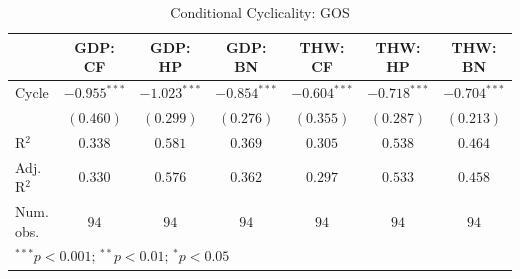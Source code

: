 
\usepackage{booktabs}

\begin{table}
\begin{center}
\begin{tabular}{l c c c c c c}
\toprule
 & GDP: CF & GDP: HP & GDP: BN & THW: CF & THW: HP & THW: BN \\
\midrule
Cycle      & $-0.955^{***}$ & $-1.023^{***}$ & $-0.854^{***}$ & $-0.604^{***}$ & $-0.718^{***}$ & $-0.704^{***}$ \\
           & $(0.460)$      & $(0.299)$      & $(0.276)$      & $(0.355)$      & $(0.287)$      & $(0.213)$      \\
\midrule
R$^2$      & $0.338$        & $0.581$        & $0.369$        & $0.305$        & $0.538$        & $0.464$        \\
Adj. R$^2$ & $0.330$        & $0.576$        & $0.362$        & $0.297$        & $0.533$        & $0.458$        \\
Num. obs.  & $94$           & $94$           & $94$           & $94$           & $94$           & $94$           \\
\bottomrule
\multicolumn{7}{l}{\scriptsize{$^{***}p<0.001$; $^{**}p<0.01$; $^{*}p<0.05$}}
\end{tabular}
\caption{Conditional Cyclicality: GOS}
\label{tab:gos_cycle}
\end{center}
\end{table}
